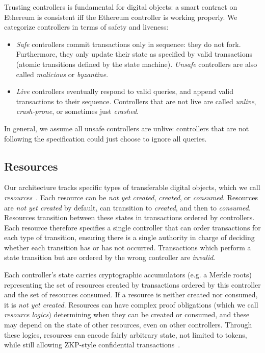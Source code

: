 \documentclass[a4paper,USenglish,cleveref, autoref, thm-restate, anonymous]{lipics-v2021}
\begin{document}
Trusting controllers is fundamental for digital objects: a smart contract on Ethereum is consistent iff the Ethereum controller is working properly.
We categorize controllers in terms of safety and liveness:
\begin{itemize}
\item \textit{Safe} controllers commit transactions only in sequence: they do not fork.
Furthermore, they only update their state as specified by valid transactions (atomic transitions defined by the state machine).
  \textit{Unsafe} controllers are also called \textit{malicious} or \textit{byzantine}.  
\item \textit{Live} controllers eventually respond to valid queries, and append valid transactions to their sequence.
  Controllers that are not live are called \textit{unlive}, \textit{crash-prone}, or sometimes just \textit{crashed}.
\end{itemize}
In general, we assume all unsafe controllers are unlive: controllers that are not following the specification could just choose to ignore all queries.


\subsection{Resources}
Our architecture tracks specific types of transferable digital objects, which we call \emph{resources}~\cite{resource}.
Each resource can be \emph{not yet created}, \emph{created}, or \emph{consumed}.
Resources are \emph{not yet created} by default, can transition to \emph{created}, and then to \emph{consumed}.
Resources transition between these states in transactions ordered by controllers.
Each resource therefore specifies a single controller that can order transactions for each type of transition, ensuring there is a single authority in charge of deciding whether each transition has or has not occurred.
Transactions which perform a state transition but are ordered by the wrong controller are \emph{invalid}.

Each controller's state carries cryptographic accumulators (e.g. a Merkle roots) representing the set of resources created by transactions ordered by this controller and the set of resources consumed.
If a resource is neither created nor consumed, it is \emph{not yet created}.
Resources can have complex proof obligations (which we call \emph{resource logics}) determining when they can be created or consumed, and these may depend on the state of other resources, even on other controllers.
Through these logics, resources can encode fairly arbitrary state, not limited to tokens, while still allowing ZKP-style confidential transactions~\cite{resource}.
\end{document}
